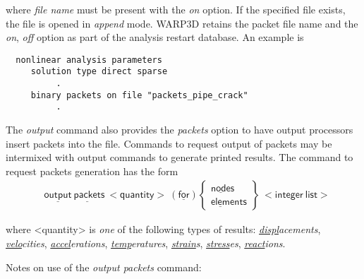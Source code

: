 \documentclass[11pt]{report}
\numberwithin{equation}{section}
\newcommand{\nin} {\noindent}
\newcommand{\ul} {\underline}
\newcommand{\hv} {\mathsf}   %
\newcommand{\ti}{\emph}
\newcommand{\tl}{\textless\xspace}
\newcommand{\tg}{\textgreater\xspace}
\begin{document}
\nin where \ti{file name} must be present with the \ti{on} option. If the specified file exists,
the file is opened in \ti{append} mode.
WARP3D retains the packet file name and the \ti{on}, \ti{off}
option as part of the analysis restart database. An example is 
\small
\begin{verbatim}
  nonlinear analysis parameters
     solution type direct sparse 
          .
     binary packets on file "packets_pipe_crack"
          .
\end{verbatim}
\normalsize

The \ti{output} command also provides the \ti{packets} option to have output processors insert
packets into the file. Commands to request output of packets may be intermixed
with output commands to generate printed results. The command to request packets
generation has the form
\begin{align*}
& \hv{\ul{output}\ \ul{packet}s \ <quantity>\ (\ul{for})  }
\begin{Bmatrix}
\hv{\ul{node}s} \\ \hv{\ul{elem}ents} 
\end{Bmatrix} \ \hv{<integer\ list>}
\end{align*}

\nin where \tl{quantity}\tg is \ti{one} of the following types of results: 
\ti{\ul{displ}acements},
\ti{\ul{velo}cities}, 
\ti{\ul{accel}erations}, \ti{\ul{temp}eratures}, \ti{\ul{strain}s}, 
\ti{\ul{stress}es}, \ti{\ul{react}ions}. 

\nin Notes on use of the \ti{output packets} command:
\end{document}

